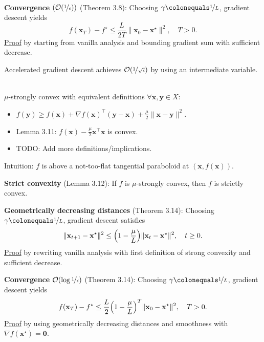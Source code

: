 \documentclass{article}
\newcommand{\lft}{\mathopen{}\mathclose\bgroup\left}
\newcommand{\rgt}{\aftergroup\egroup\right}
\renewcommand{\vec}[1]{\mathbf{#1}}
\newcommand{\transpose}[1]{#1^\top}
\newenvironment{topic}[1]
{\textbf{\sffamily \colorbox{black}{\rlap{\textbf{\textcolor{white}{#1}}}\hspace{\linewidth}\hspace{-2\fboxsep}}} \\ \vspace{0.2cm}}
{}
\begin{document}
\begin{multicols*}{2}
\begin{topic}{3 Smooth functions}
        \textbf{Convergence} $(\mathcal{O}(\nicefrac{1}{\epsilon}))$ (Theorem 3.8): Choosing $\gamma \colonequals \nicefrac{1}{L}$, gradient descent yields \[
            f(\vec{x}_T) - f^\star \leq \frac{L}{2T} \| \vec{x}_0 - \vec{x}^\star \|^2, \quad T > 0.
        \]
        \underline{Proof} by starting from vanilla analysis and bounding gradient sum with sufficient decrease.

        Accelerated gradient descent achieves $\mathcal{O}(\nicefrac{1}{\sqrt{\epsilon}})$ by using an
        intermediate variable.
    \end{topic}

    \begin{topic}{3 Strongly convex functions}
        $\mu$-strongly convex with equivalent definitions $\forall \vec{x}, \vec{y} \in X$:
        \begin{itemize}
            \item $f(\vec{y}) \geq f(\vec{x}) + \transpose{\nabla f(\vec{x})} (\vec{y} - \vec{x}) + \frac{\mu}{2} \| \vec{x} - \vec{y} \|^2$.
            \item Lemma 3.11: $f(\vec{x}) - \frac{\mu}{2} \transpose{\vec{x}} \vec{x}$ is convex.
            \item TODO: Add more definitions/implications.
        \end{itemize}
        Intuition: $f$ is above a not-too-flat tangential paraboloid at $(\vec{x}, f(\vec{x}))$.

        \textbf{Strict convexity} (Lemma 3.12): If $f$ is $\mu$-strongly convex, then $f$ is strictly convex.

        \textbf{Geometrically decreasing distances} (Theorem 3.14): Choosing $\gamma \colonequals \nicefrac{1}{L}$, gradient descent satisfies \[
            \| \vec{x}_{t+1} - \vec{x}^\star \|^2 \leq \lft( 1 - \frac{\mu}{L} \rgt) \| \vec{x}_t - \vec{x}^\star \|^2, \quad t \geq 0.
        \]
        \underline{Proof} by rewriting vanilla analysis with first definition of strong convexity and
        sufficient decrease.

        \textbf{Convergence} $\mathcal{O}(\log \nicefrac{1}{\epsilon})$ (Theorem 3.14): Choosing $\gamma \colonequals \nicefrac{1}{L}$, gradient descent yields \[
            f(\vec{x}_T) - f^\star \leq \frac{L}{2} \lft( 1 - \frac{\mu}{L} \rgt)^T \| \vec{x}_0 - \vec{x}^\star \|^2, \quad T > 0.
        \]
        \underline{Proof} by using geometrically decreasing distances and smoothness with
        $\nabla f(\vec{x}^\star) = \vec{0}$.
    \end{topic}


\end{multicols*}
\end{document}
